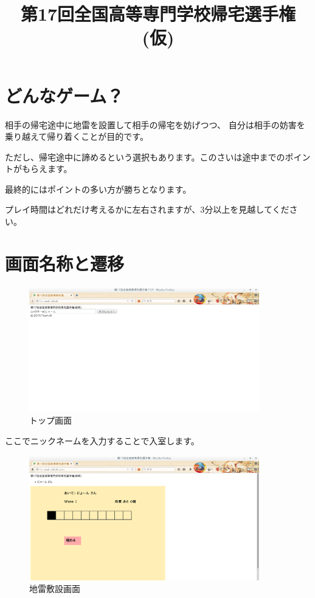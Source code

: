 \documentclass{jsarticle}
\title{第17回全国高等専門学校帰宅選手権(仮)}
\begin{document}
\section{どんなゲーム？}\label{ux3069ux3093ux306aux30b2ux30fcux30e0}

相手の帰宅途中に地雷を設置して相手の帰宅を妨げつつ、
自分は相手の妨害を乗り越えて帰り着くことが目的です。

ただし、帰宅途中に諦めるという選択もあります。このさいは途中までのポイントがもらえます。

最終的にはポイントの多い方が勝ちとなります。

プレイ時間はどれだけ考えるかに左右されますが、3分以上を見越してください。

\section{画面名称と遷移}\label{ux753bux9762ux540dux79f0ux3068ux9077ux79fb}

\begin{figure}[htbp]
\centering
\includegraphics[width=10cm]{./top.png}
\caption{トップ画面}
\end{figure}

ここでニックネームを入力することで入室します。

\begin{figure}[htbp]
\centering
\includegraphics[width=10cm]{./mine.png}
\caption{地雷敷設画面}
\end{figure}
\end{document}
